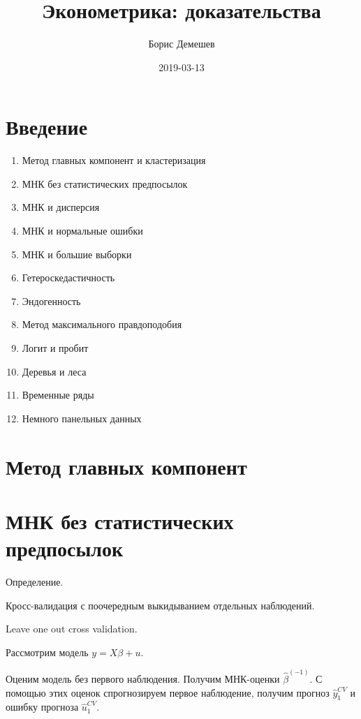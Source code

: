 \documentclass[11pt,russian,]{book}
\title{Эконометрика: доказательства}
\author{Борис Демешев}
\date{2019-03-13}
\begin{document}
\maketitle

{
\setcounter{tocdepth}{1}
\tableofcontents
}
\hypertarget{intro}{%
\chapter{Введение}\label{intro}}

\begin{enumerate}
\def\labelenumi{\arabic{enumi}.}
\item
  Метод главных компонент и кластеризация
\item
  МНК без статистических предпосылок
\item
  МНК и дисперсия
\item
  МНК и нормальные ошибки
\item
  МНК и большие выборки
\item
  Гетероскедастичность
\item
  Эндогенность
\item
  Метод максимального правдоподобия
\item
  Логит и пробит
\item
  Деревья и леса
\item
  Временные ряды
\item
  Немного панельных данных
\end{enumerate}

\hypertarget{pca}{%
\chapter{Метод главных компонент}\label{pca}}

\hypertarget{ols_wo_stats}{%
\chapter{МНК без статистических предпосылок}\label{ols_wo_stats}}

Определение.

Кросс-валидация с поочередным выкидыванием отдельных наблюдений.

Leave one out cross validation.

Рассмотрим модель \(y=X\beta + u\).

Оценим модель без первого наблюдения. Получим МНК-оценки \(\hat\beta^{(-1)}\).
С помощью этих оценок спрогнозируем первое наблюдение, получим прогноз \(\hat y_1^{CV}\) и ошибку прогноза \(\hat u_1^{CV}\).
\end{document}

